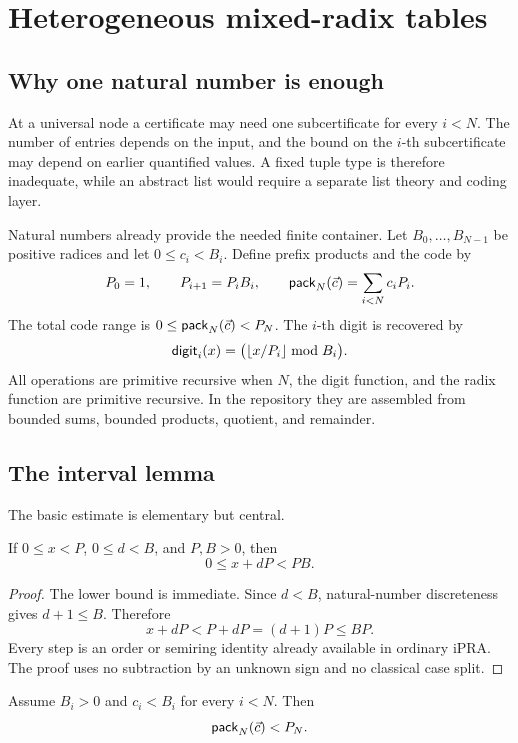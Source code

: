 \section{Heterogeneous mixed-radix tables}

\subsection{Why one natural number is enough}

At a universal node a certificate may need one subcertificate for every
\(i<N\).  The number of entries depends on the input, and the bound on the
\(i\)-th subcertificate may depend on earlier quantified values.  A fixed tuple
type is therefore inadequate, while an abstract list would require a separate
list theory and coding layer.

Natural numbers already provide the needed finite container.  Let
\(B_0,\ldots,B_{N-1}\) be positive radices and let
\(0\le c_i<B_i\).  Define prefix products and the code by
\[
  P_0=1,\qquad P_{i+1}=P_iB_i,
  \qquad
  \mathsf{pack}_N(\vec c)=\sum_{i<N}c_iP_i.
\]
The total code range is \(0\le\mathsf{pack}_N(\vec c)<P_N\).  The \(i\)-th digit is
recovered by
\[
  \mathsf{digit}_i(x)=\bigl(\lfloor x/P_i\rfloor\bmod B_i\bigr).
\]
All operations are primitive recursive when \(N\), the digit function, and the
radix function are primitive recursive.  In the repository they are assembled
from bounded sums, bounded products, quotient, and remainder.

\subsection{The interval lemma}

The basic estimate is elementary but central.

\begin{lemma}
If \(0\le x<P\), \(0\le d<B\), and \(P,B>0\), then
\[
  0\le x+dP<PB.
\]
\end{lemma}

\begin{proof}
The lower bound is immediate.  Since \(d<B\), natural-number discreteness gives
\(d+1\le B\).  Therefore
\[
  x+dP < P+dP=(d+1)P\le BP.
\]
Every step is an order or semiring identity already available in ordinary iPRA.
The proof uses no subtraction by an unknown sign and no classical case split.
\end{proof}

\begin{theorem}
Assume \(B_i>0\) and \(c_i<B_i\) for every \(i<N\).  Then
\[
  \mathsf{pack}_N(\vec c)<P_N.
\]
\end{theorem}


